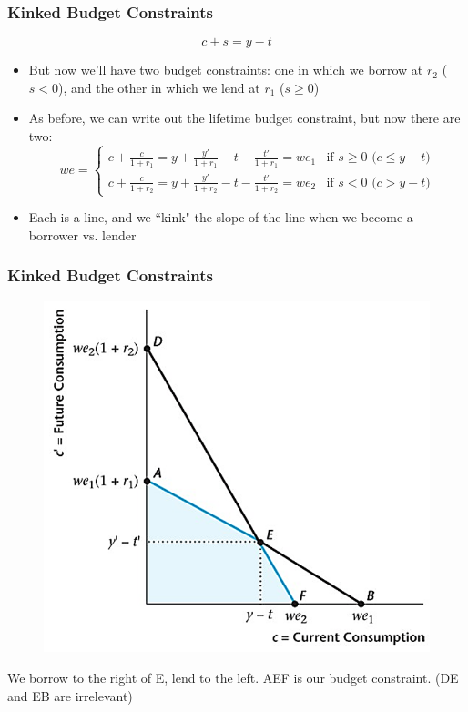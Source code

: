 \documentclass{beamer}
\begin{document}
\begin{frame}
\frametitle[alignment=center]{Kinked Budget Constraints}
$$c+s=y-t$$
\begin{itemize}
\bigskip
\item But now we'll have two budget constraints: one in which we borrow at $r_2$ ($s<0$), and the other in which we lend at $r_1$ ($s\geq 0$)
\item As before, we can write out the lifetime budget constraint, but now there are two:
\small
$$we=\begin{cases}c+\frac{c}{1+r_1}=y+\frac{y'}{1+r_1}-t-\frac{t'}{1+r_1}=we_1 & \text{if $s\geq0$ ($c\leq y-t$)} \\ 
c+\frac{c}{1+r_2}=y+\frac{y'}{1+r_2}-t-\frac{t'}{1+r_2}=we_2 & \text{if $s<0$ ($c> y-t$)}
\end{cases}$$
\item Each is a line, and we ``kink" the slope of the line when we become a borrower vs. lender
\end{itemize}
\end{frame}

\begin{frame}
\frametitle[alignment=center]{Kinked Budget Constraints}
\begin{figure}
\centering
\includegraphics[scale=0.5]{Figures/W_Fig_10pt1.png}
\end{figure}
We borrow to the right of E, lend to the left.  AEF is our budget constraint. (DE and EB are irrelevant)
\end{frame}
\end{document}
